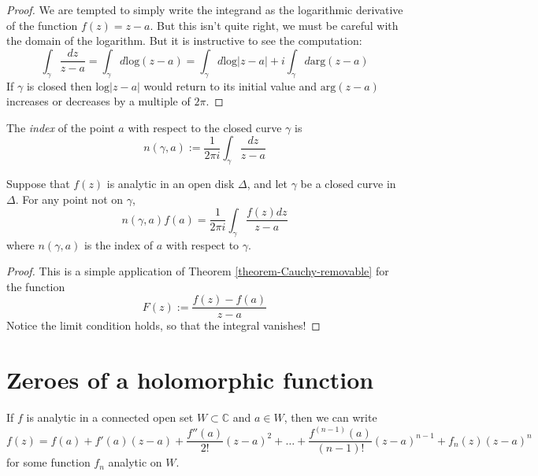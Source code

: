 \begin{proof}
We are tempted to simply write the integrand as the logarithmic derivative of
the function $f(z)=z-a$. But this isn't quite right, we must be careful with the
domain of the logarithm. But it is instructive to see the computation:
$$
\int_\gamma\frac{dz}{z-a}=\int_\gamma d \text{log}(z-a)=
\int_\gamma d\text{log}|z-a|+i\int_\gamma d \text{arg}(z-a)
$$
If  $\gamma$ is closed then $\text{log}|z-a|$ would return to its initial value
and $\text{arg}(z-a)$ increases or decreases by a multiple of $2\pi$.
\end{proof}

\begin{definition}
\label{definition-index}
The {\it index} of the point $a$ with respect to the closed curve $\gamma$ is
\begin{equation}
\label{equation-index}
n(\gamma,a):=\frac{1}{2\pi i}\int_\gamma\frac{dz}{z-a}
\end{equation}
\end{definition}

\begin{theorem}
\label{theorem-Cauchy-integral-formula}
\begin{reference}
\cite[Section 2.2, Theorem 6]{ahl}
\end{reference}
Suppose that $f(z)$ is analytic in an open disk $\Delta$, and let $\gamma$ be a
closed curve in $\Delta$. For any point not on $\gamma$,
\begin{equation}
\label{equation-Cauchy-formula-with-index}
n(\gamma,a)f(a)=\frac{1}{2\pi i}\int_\gamma\frac{f(z)dz}{z-a}
\end{equation}
where $n(\gamma,a)$ is the index of $a$ with respect to $\gamma$.
\end{theorem}

\begin{proof}
This is a simple application of Theorem \ref{theorem-Cauchy-removable} for the
function
$$
F(z):=\frac{f(z)-f(a)}{z-a}
$$
Notice the limit condition holds, so that the integral vanishes!
\end{proof}

\section{Zeroes of a holomorphic function}
\label{section-zeroes}

\begin{lemma}
\label{lemma-finite-Taylor-expansion}
If $f$ is analytic in a connected open set $W\subset\mathbb{C}$ and $a \in W$,
then we can write
$$
f(z)=f(a)+f'(a)(z-a)+\frac{f''(a)}{2!}(z-a)^2+\ldots
+\frac{f^{(n-1)}(a)}{(n-1)!}(z-a)^{n-1}+f_n(z)(z-a)^n
$$
for some function $f_n$ analytic on $W$.
\end{lemma}

